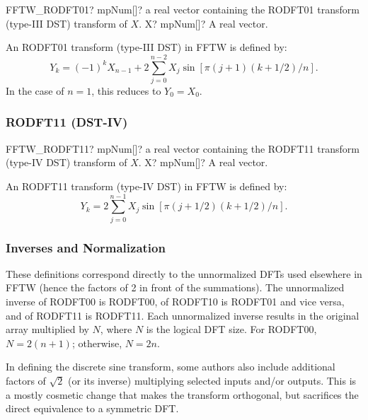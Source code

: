 \begin{mpFunctionsExtract}
	\mpFunctionOne
	{FFTW\_RODFT01? mpNum[]? a real vector containing the RODFT01 transform (type-III DST) transform of $X$.}
	{X? mpNum[]? A real vector.}
\end{mpFunctionsExtract}

An RODFT01 transform (type-III DST) in FFTW is defined by:
\begin{equation}
Y_k = (-1)^k X_{n-1} + 2 \sum^{n-2}_{j=0} X_j \sin[\pi (j+1)(k+1/2)/n].
\end{equation}
In the case of $n = 1$, this reduces to $Y_0 = X_0$. 




\subsubsection{RODFT11 (DST-IV)}

\begin{mpFunctionsExtract}
	\mpFunctionOne
	{FFTW\_RODFT11? mpNum[]? a real vector containing the RODFT11 transform (type-IV DST) transform of $X$.}
	{X? mpNum[]? A real vector.}
\end{mpFunctionsExtract}

An RODFT11 transform (type-IV DST) in FFTW is defined by:
\begin{equation}
Y_k = 2 \sum^{n-1}_{j=0} X_j \sin[\pi (j+1/2)(k+1/2)/n].
\end{equation}


\subsubsection{Inverses and Normalization}
These definitions correspond directly to the unnormalized DFTs used elsewhere in FFTW
(hence the factors of 2 in front of the summations). The unnormalized inverse of RODFT00
is RODFT00, of RODFT10 is RODFT01 and vice versa, and of RODFT11 is RODFT11. Each
unnormalized inverse results in the original array multiplied by $N$, where $N$ is the logical DFT size. For RODFT00, $N = 2(n + 1)$; otherwise, $N = 2n$.


In defining the discrete sine transform, some authors also include additional factors of
$\sqrt{2}$ (or its inverse) multiplying selected inputs and/or outputs. This is a mostly cosmetic change that makes the transform orthogonal, but sacrifices the direct equivalence to a symmetric DFT.












